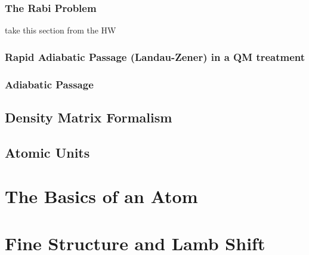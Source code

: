 \documentclass{book}
\theoremstyle{definition}
\begin{document}
\subsection{The Rabi Problem}

take this section from the HW


\subsection{Rapid Adiabatic Passage (Landau-Zener) in a QM treatment}


\subsection{Adiabatic Passage}



\section{Density Matrix Formalism}











\section{Atomic Units}







\chapter{The Basics of an Atom}








\chapter{Fine Structure and Lamb Shift}
\end{document}
